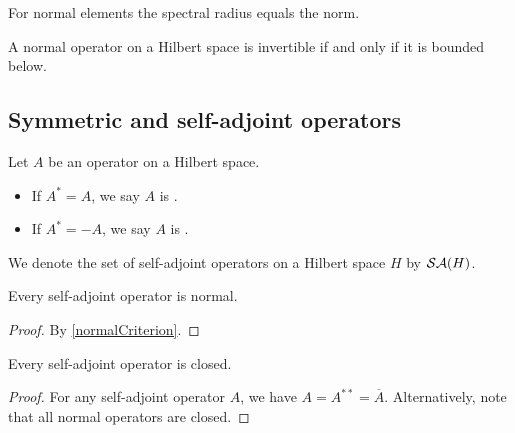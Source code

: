 \begin{lemma} \label{normalSpectralRadiusEqualsNorm}
For normal elements the spectral radius equals the norm.
\end{lemma}

\begin{lemma}
A normal operator on a Hilbert space is invertible \textup{if and only if} it is bounded below.
\end{lemma}

\subsection{Symmetric and self-adjoint operators}
\begin{definition}
Let $A$ be an operator on a Hilbert space.
\begin{itemize}
\item If $A^* = A$, we say $A$ is .
\item If $A^* = -A$, we say $A$ is .
\end{itemize}
We denote the set of self-adjoint operators on a Hilbert space $H$ by $\mathop{\mathcal{SA}}\nolimits(H)$.
\end{definition}

\begin{lemma}
Every self-adjoint operator is normal.
\end{lemma}
\begin{proof}
By \ref{normalCriterion}.
\end{proof}

\begin{lemma} \label{selfAdjointClosed}
Every self-adjoint operator is closed.
\end{lemma}
\begin{proof}
For any self-adjoint operator $A$, we have $A = A^{**} = \overline{A}$. Alternatively, note that all normal operators are closed.
\end{proof}

